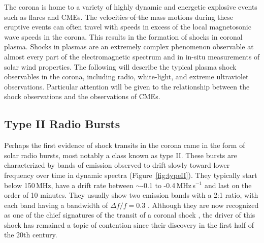 The corona is home to a {\color{blue}variety} of highly dynamic and energetic explosive events such as flares and CMEs. The \st{velocities of the} mass motions during these eruptive events can often travel with speeds in excess of the local magnetosonic wave speeds in the corona. This results in the formation of {\color{blue}shocks in coronal plasma}. {\color{blue}Shocks in plasmas} are an extremely complex phenomenon observable at almost every part of the electromagnetic spectrum {\color{blue}and in in-situ measurements of solar wind properties}. The following will describe the typical plasma shock observables in the corona, including radio, white-light, and extreme ultraviolet observations. Particular attention will be given to the relationship between the shock observations and the observations of CMEs.

\subsection{Type II Radio Bursts}
Perhaps the first evidence of shock transits in the corona came in the form of solar radio bursts, most notably a class known as type II. These bursts are characterized by bands of emission observed to drift slowly toward lower frequency over time in dynamic spectra (Figure~\ref{fig:typeII}). They typically start below 150\,MHz, have a drift rate between $\sim$-0.1 to -0.4\,MHz\,s$^{-1}$ and last on the order of 10 minutes.  They usually show two emission bands with a 2:1 ratio, with each band having a bandwidth of $\Delta f/f=0.3$ \citep{mann1995a}. Although they are now recognized as one of the chief signatures of the transit of a coronal shock \citep{nelson1985, mann1996}, the driver of this shock has remained a topic of contention since their discovery in the first half of the 20th century.

